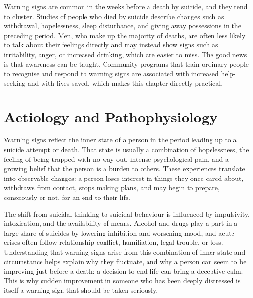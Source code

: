 Warning signs are common in the weeks before a death by suicide, and they tend to cluster. Studies of people who died by suicide describe changes such as withdrawal, hopelessness, sleep disturbance, and giving away possessions in the preceding period. Men, who make up the majority of deaths, are often less likely to talk about their feelings directly and may instead show signs such as irritability, anger, or increased drinking, which are easier to miss. The good news is that awareness can be taught. Community programs that train ordinary people to recognise and respond to warning signs are associated with increased help-seeking and with lives saved, which makes this chapter directly practical.

\section*{Aetiology and Pathophysiology}
Warning signs reflect the inner state of a person in the period leading up to a suicide attempt or death. That state is usually a combination of hopelessness, the feeling of being trapped with no way out, intense psychological pain, and a growing belief that the person is a burden to others. These experiences translate into observable changes: a person loses interest in things they once cared about, withdraws from contact, stops making plans, and may begin to prepare, consciously or not, for an end to their life.

The shift from suicidal thinking to suicidal behaviour is influenced by impulsivity, intoxication, and the availability of means. Alcohol and drugs play a part in a large share of suicides by lowering inhibition and worsening mood, and acute crises often follow relationship conflict, humiliation, legal trouble, or loss. Understanding that warning signs arise from this combination of inner state and circumstance helps explain why they fluctuate, and why a person can seem to be improving just before a death: a decision to end life can bring a deceptive calm. This is why sudden improvement in someone who has been deeply distressed is itself a warning sign that should be taken seriously.

